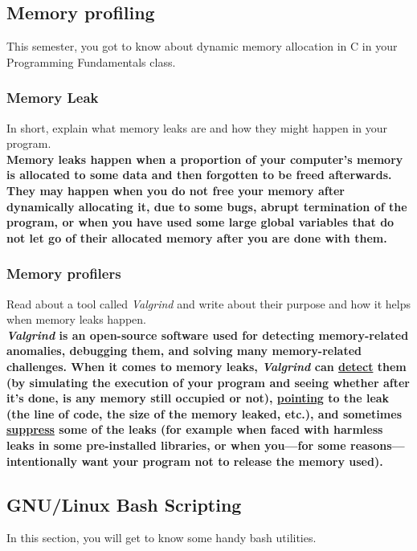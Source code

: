 \documentclass[titlepage, 12pt]{article}
\begin{document}
	\subsection{Memory profiling}
	This semester, you got to know about dynamic memory allocation in C in your Programming
	Fundamentals class.
	\subsubsection{Memory Leak}
	In short, explain what memory leaks are and how they might happen in your program.
	\\
	\textbf{Memory leaks happen when a proportion of your computer's memory is allocated to some data and then forgotten to be freed afterwards. They may happen when you do not free your memory after dynamically allocating it, due to some bugs, abrupt termination of the program, or when you have used some large global variables that do not let go of their allocated memory after you are done with them.}
	
	\subsubsection{Memory profilers}
	Read about a tool called \textit{Valgrind} and write about their purpose and how it helps when memory leaks happen.
	\\
	\textbf{\textit{Valgrind} is an open-source software used for detecting memory-related anomalies, debugging them, and solving many memory-related challenges. When it comes to memory leaks, \textit{Valgrind} can \underline{detect} them (by simulating the execution of your program and seeing whether after it's done, is any memory still occupied or not), \underline{pointing} to the leak (the line of code, the size of the memory leaked, etc.), and sometimes \underline{suppress} some of the leaks (for example when faced with harmless leaks in some pre-installed libraries, or when you---for some reasons---intentionally want your program not to release the memory used).}
	
	\subsection{GNU/Linux Bash Scripting}
	In this section, you will get to know some handy bash utilities.
\end{document}
